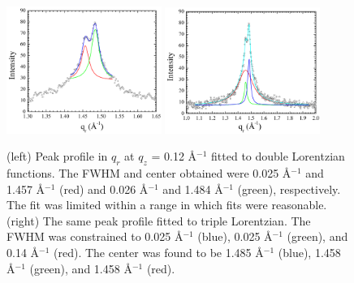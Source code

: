 \begin{figure}[htbp]
  \centering
  \includegraphics[width=0.45\textwidth]{figures/ripple/nGIWAXS/weak_peak_Lorentz}
  \includegraphics[width=0.45\textwidth]{figures/ripple/nGIWAXS/weak_peak_tripleLorentz}
  \caption[Peak profile in $q_r$ at $q_z$ = 0.12 \AA$^{-1}$ fitted to
  double Lorentzian (left) and double pseudo Voigtian functions (right)]
  {(left) Peak profile in $q_r$ at $q_z$ = 0.12 \AA$^{-1}$ fitted to
  double Lorentzian functions. 
  The FWHM and center obtained were 0.025 \AA$^{-1}$ and 1.457 \AA$^{-1}$ (red) 
  and 0.026 \AA$^{-1}$ and 1.484 \AA$^{-1}$ (green), respectively.
  The fit was limited within a range in which fits were reasonable.
  (right) The same peak profile fitted to triple Lorentzian. The FWHM was
  constrained to 0.025 \AA$^{-1}$ (blue), 0.025 \AA$^{-1}$ (green), and 0.14 \AA$^{-1}$ (red).
  The center was found to be 1.485 \AA$^{-1}$ (blue), 1.458 \AA$^{-1}$ (green), 
  and 1.458 \AA$^{-1}$ (red).}
  \label{fig:weak_peak}
\end{figure}

